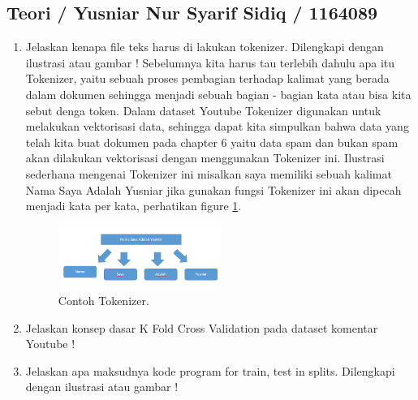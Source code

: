 \subsection{Teori / Yusniar Nur Syarif Sidiq / 1164089}
\begin{enumerate}

\item Jelaskan kenapa file teks harus di lakukan tokenizer. Dilengkapi dengan ilustrasi atau gambar !
	\subitem Sebelumnya kita harus tau terlebih dahulu apa itu Tokenizer, yaitu sebuah proses pembagian terhadap kalimat yang berada dalam dokumen sehingga menjadi sebuah bagian - bagian kata atau bisa kita sebut denga token. Dalam dataset Youtube Tokenizer digunakan untuk melakukan vektorisasi data, sehingga dapat kita simpulkan bahwa data yang telah kita buat dokumen pada chapter 6 yaitu data spam dan bukan spam akan dilakukan vektorisasi dengan menggunakan Tokenizer ini. Ilustrasi sederhana mengenai Tokenizer ini misalkan saya memiliki sebuah kalimat Nama Saya Adalah Yusniar jika gunakan fungsi Tokenizer ini akan dipecah menjadi kata per kata, perhatikan figure \ref{YNC7-1}.

	\begin{figure}[!htbp!]
		\centerline{\includegraphics[width=0.5\textwidth]{figures/YN/Chapter7/YNC7-1.png}}
		\caption{Contoh Tokenizer.}
		\label{YNC7-1}
	\end{figure}

\item Jelaskan konsep dasar K Fold Cross Validation pada dataset komentar Youtube !

\item Jelaskan apa maksudnya kode program for train, test in splits. Dilengkapi dengan ilustrasi atau gambar !

\end{enumerate}